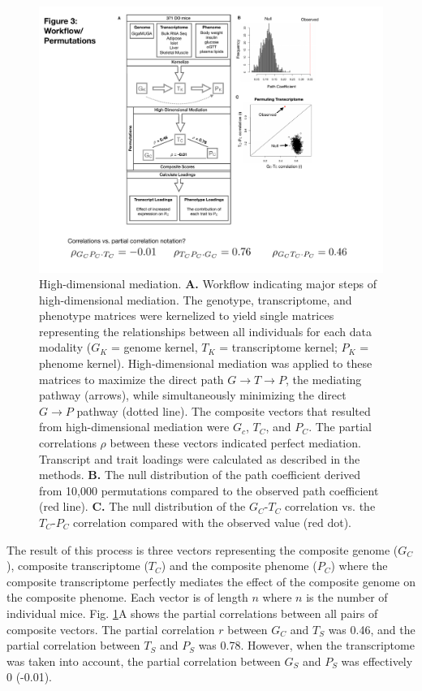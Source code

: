 \documentclass[
]{article}
\begin{document}
\begin{figure}[ht!]
\includegraphics[width=5in]{Figures/Fig3_workflow.pdf} 
\caption{High-dimensional mediation. \textbf{A.} Workflow indicating 
major steps of high-dimensional mediation. The genotype, transcriptome, 
and phenotype matrices were kernelized to yield single matrices representing 
the relationships between all individuals for each data modality ($G_K$ = 
genome kernel, $T_K$ = transcriptome kernel; $P_K$ = phenome kernel). High-dimensional 
mediation was applied to these matrices to maximize the direct path 
$G \rightarrow T \rightarrow P$, the mediating pathway (arrows), while 
simultaneously minimizing the direct $G \rightarrow P$ pathway (dotted line). 
The composite vectors that resulted from high-dimensional mediation were 
$G_c$, $T_C$, and $P_C$. The partial correlations $\rho$ between these vectors 
indicated perfect mediation. Transcript and trait loadings were calculated 
as described in the methods. \textbf{B.} The null distribution of the path 
coefficient derived from 10,000 permutations compared to the observed path 
coefficient (red line). \textbf{C.} The null distribution of the $G_C$-$T_C$ 
correlation vs. the $T_C$-$P_C$ correlation compared with the observed value 
(red dot).
}
\label{fig:workflow}
\end{figure}

The result of this process is three vectors representing the composite
genome (\(G_C\)), composite transcriptome (\(T_C\)) and the composite
phenome (\(P_C\)) where the composite transcriptome perfectly mediates
the effect of the composite genome on the composite phenome. Each vector
is of length \(n\) where \(n\) is the number of individual mice. Fig.
\ref{fig:workflow}A shows the partial correlations between all pairs of
composite vectors. The partial correlation \(r\) between \(G_C\) and
\(T_S\) was 0.46, and the partial correlation between \(T_S\) and
\(P_S\) was 0.78. However, when the transcriptome was taken into
account, the partial correlation between \(G_S\) and \(P_S\) was
effectively 0 (-0.01).
\end{document}
